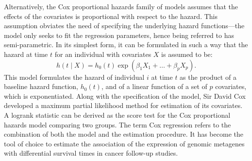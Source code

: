 
Alternatively, the Cox proportional hazards family of models assumes that the
effects of the covariates is proportional with respect to the
hazard.\cite{cox_regression_1972} This assumption obviates the need of
specifying the underlying hazard functions---the model only seeks to fit the
regression parameters, hence being referred to has semi-parametric.  In its
simplest form, it can be formulated in such a way that the hazard at time $t$
for an individual with covariates $X$ is assumed to be:
\begin{equation}
  \label{eq:proportional-hazards}
  h(t \mid X)=h_0(t) \exp(\beta_1 X_{1}+\ldots+\beta_pX_{p}).
\end{equation}
This model formulates the hazard of individual $i$ at time $t$ as the product of
a baseline hazard function, $h_0(t)$, and of a linear function of a set of $p$
covariates, which is exponentiated.  Along with the specification of the model,
Sir David Cox developed a maximum partial likelihood method for estimation
of its covariates.\cite{cox_regression_1972} A logrank statistic can be
derived as the score test for the Cox proportional hazards model comparing two
groups.  The term Cox regression refers to the combination of both the model and
the estimation procedure.  It has become the tool of choice to estimate the
association of the expression of genomic metagenes with differential survival
times in cancer follow-up studies.


